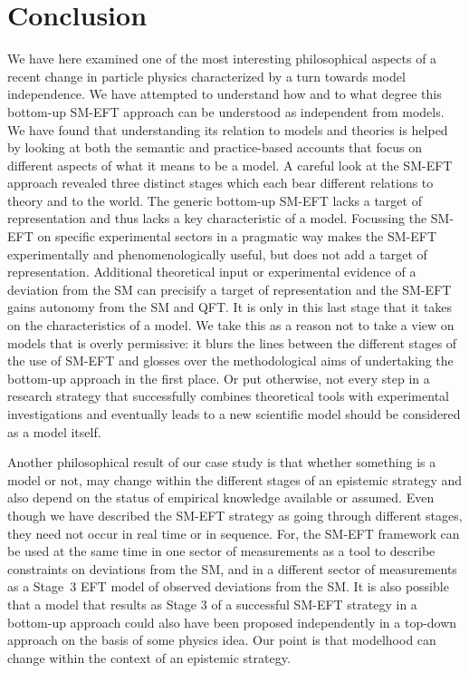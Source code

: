 \section{Conclusion}


We have here examined one of the most interesting philosophical aspects of a recent change in particle physics characterized by a turn towards model independence. 
We have attempted to understand how and to what degree this bottom-up SM-EFT approach can be understood as independent from models. 
We have found that understanding its relation to models and theories is helped by looking at both the semantic and practice-based accounts that focus on different aspects of what it means to be a model. 
A careful look at the SM-EFT approach revealed three distinct stages which each bear different relations to theory and to the world. 
The generic bottom-up SM-EFT lacks a target of representation and thus lacks a key characteristic of a model. Focussing the SM-EFT on specific experimental sectors in a pragmatic way makes the SM-EFT experimentally and phenomenologically useful, but does not add a target of representation. Additional theoretical input or experimental evidence of a deviation from the SM can precisify a target of representation and the SM-EFT gains autonomy from the SM and QFT. It is only in this last stage that it takes on the characteristics of a model.
We take this as a reason not to take a view on models that is overly permissive: it blurs the lines between the different stages of the use of SM-EFT and glosses over the methodological aims of undertaking the bottom-up approach in the first place. 
Or put otherwise, not every step in a research strategy that successfully combines theoretical tools with experimental investigations and eventually leads to a new scientific model should be considered as a model itself.

Another philosophical result of our case study is that whether something is a model or not, may change within the different stages of an epistemic strategy and also depend on the status of empirical knowledge available or assumed.
Even though we have described the SM-EFT strategy as going through different stages, they need not occur in real time or in sequence. For, the SM-EFT framework can be used at the same time in one sector of measurements as a tool to describe constraints on deviations from the SM, and in a different sector of measurements as a Stage~3 EFT model of observed deviations from the SM.
It is also possible that a model that results as Stage 3 of a successful SM-EFT strategy in a bottom-up approach could also have been proposed independently in a top-down approach on the basis of some physics idea. Our point is that modelhood can change within the context of an epistemic strategy.







